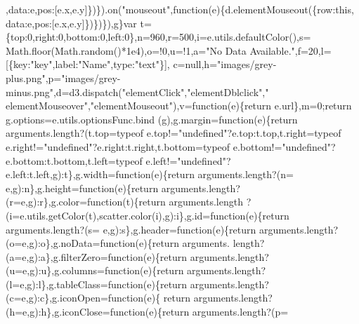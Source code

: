 \begin{DoxyCode}
{{      ,data:e,pos:[e.x,e.y]\})\}).on(\textcolor{stringliteral}{"mouseout"},\textcolor{keyword}{function}(e)\{d.elementMouseout(\{row:\textcolor{keyword}{this},
      data:e,pos:[e.x,e.y]\})\})\}),g\}var t=\{top:0,right:0,bottom:0,left:0\},n=960,r=500,i=e.utils.defaultColor(),s=
      Math.floor(Math.random()*1e4),o=!0,u=!1,a=\textcolor{stringliteral}{"No Data Available."},f=20,l=[\{key:\textcolor{stringliteral}{"key"},label:\textcolor{stringliteral}{"Name"},type:\textcolor{stringliteral}{"text"}\}],
      c=null,h=\textcolor{stringliteral}{"images/grey-plus.png"},p=\textcolor{stringliteral}{"images/grey-minus.png"},d=d3.dispatch(\textcolor{stringliteral}{"elementClick"},\textcolor{stringliteral}{"elementDblclick"},\textcolor{stringliteral}{"
      elementMouseover"},\textcolor{stringliteral}{"elementMouseout"}),v=\textcolor{keyword}{function}(e)\{\textcolor{keywordflow}{return} e.url\},m=0;\textcolor{keywordflow}{return} g.options=e.utils.optionsFunc.bind
      (g),g.margin=\textcolor{keyword}{function}(e)\{\textcolor{keywordflow}{return} arguments.length?(t.top=typeof e.top!=\textcolor{stringliteral}{"undefined"}?e.top:t.top,t.right=typeof
       e.right!=\textcolor{stringliteral}{"undefined"}?e.right:t.right,t.bottom=typeof e.bottom!=\textcolor{stringliteral}{"undefined"}?e.bottom:t.bottom,t.left=typeof 
      e.left!=\textcolor{stringliteral}{"undefined"}?e.left:t.left,g):t\},g.width=\textcolor{keyword}{function}(e)\{\textcolor{keywordflow}{return} arguments.length?(n=
      e,g):n\},g.height=\textcolor{keyword}{function}(e)\{\textcolor{keywordflow}{return} arguments.length?(r=e,g):r\},g.color=\textcolor{keyword}{function}(t)\{\textcolor{keywordflow}{return} arguments.length
      ?(i=e.utils.getColor(t),scatter.color(i),g):i\},g.id=\textcolor{keyword}{function}(e)\{\textcolor{keywordflow}{return} arguments.length?(s=
      e,g):s\},g.header=\textcolor{keyword}{function}(e)\{\textcolor{keywordflow}{return} arguments.length?(o=e,g):o\},g.noData=\textcolor{keyword}{function}(e)\{\textcolor{keywordflow}{return} arguments.
      length?(a=e,g):a\},g.filterZero=\textcolor{keyword}{function}(e)\{\textcolor{keywordflow}{return} arguments.length?(u=e,g):u\},g.columns=\textcolor{keyword}{function}(e)\{\textcolor{keywordflow}{return} 
      arguments.length?(l=e,g):l\},g.tableClass=\textcolor{keyword}{function}(e)\{\textcolor{keywordflow}{return} arguments.length?(c=e,g):c\},g.iconOpen=\textcolor{keyword}{function}(e)\{\textcolor{keywordflow}{
      return} arguments.length?(h=e,g):h\},g.iconClose=\textcolor{keyword}{function}(e)\{\textcolor{keywordflow}{return} arguments.length?(p=
}}
\end{DoxyCode}
